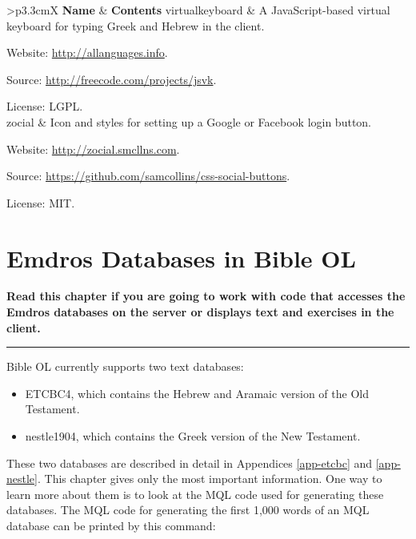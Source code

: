 \documentclass[11pt,oneside,a4paper]{memoir}
\makeatletter
\newenvironment{my-longtabu}[2]{
\begin{longtabu*}{@{}#1@{}}
  \toprule
  #2\\\addlinespace[-1mm]
  \midrule
  \endhead

  \emph{\rmfamily\normalsize(Continued...)} & \\
  \endfoot

  \addlinespace[-1mm]\bottomrule
  \endlastfoot
}{%
\end{longtabu*}
}
\newcommand{\headii}[2]{\textbf{#1} & \textbf{#2}}
\makeatother
\begin{document}
\begin{my-longtabu}{>{\ttfamily}p{3.3cm}X}{ \headii{\textrm{Name}}{Contents} }
virtualkeyboard & A JavaScript-based virtual keyboard%
for typing Greek and Hebrew in the client.

Website: \url{http://allanguages.info}.

Source: \url{http://freecode.com/projects/jsvk}.

License: LGPL.\\

zocial & Icon and styles for setting up a Google or Facebook
login button.

Website: \url{http://zocial.smcllns.com}.

Source: \url{https://github.com/samcollins/css-social-buttons}.

License: MIT. \\
\end{my-longtabu}



\chapter{Emdros Databases in Bible OL}

\textbf{Read this chapter if you are going to work with code that accesses the Emdros databases on
  the server or displays text and exercises in the client.}
\plainbreak{3}

Bible OL currently supports two text databases:

\begin{itemize}
\item ETCBC4, which contains the Hebrew and Aramaic version of the Old
  Testament.
\item nestle1904, which contains the Greek version of the New Testament.
\end{itemize}

These two databases are described in detail in Appendices \ref{app-etcbc} and
\ref{app-nestle}. This chapter gives only the most important information.
One way to learn more about them is to look at the MQL code used for generating these databases. The
MQL code for generating the first 1,000 words of an MQL database can be printed by this command:
\end{document}

